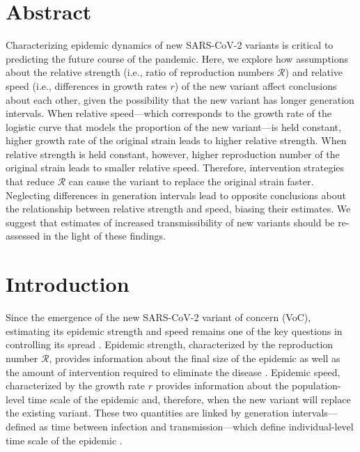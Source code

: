 \documentclass[12pt]{article}
\date{\today}
\newcommand{\RR}{\ensuremath{{\mathcal R}}\xspace}
\begin{document}
\begin{flushleft}{
	\Large
	\textbf{}
}
\end{flushleft}

\section*{Abstract}

Characterizing epidemic dynamics of new SARS-CoV-2 variants is critical to predicting the future course of the pandemic.
Here, we explore how assumptions about the relative strength (i.e., ratio of reproduction numbers $\RR$) and relative speed (i.e., differences in growth rates $r$) of the new variant affect conclusions about each other, given the possibility that the new variant has longer generation intervals.
When relative speed---which corresponds to the growth rate of the logistic curve that models the proportion of the new variant---is held constant, higher growth rate of the original strain leads to higher relative strength.
When relative strength is held constant, however, higher reproduction number of the original strain leads to smaller relative speed.
Therefore, intervention strategies that reduce $\RR$ can cause the variant to replace the original strain faster.
Neglecting differences in generation intervals lead to opposite conclusions about the relationship between relative strength and speed, biasing their estimates.
We suggest that estimates of increased transmissibility of new variants should be re-assessed in the light of these findings.

\section{Introduction}

Since the emergence of the new SARS-CoV-2 variant of concern (VoC), estimating its epidemic strength and speed remains one of the key questions in controlling its spread \citep{switzerland2021variant, davies2021estimated, di2021impact, leung2021early, volz2021transmission,zhao2021}.
Epidemic strength, characterized by the reproduction number $\RR$, provides information about the final size of the epidemic as well as the amount of intervention required to eliminate the disease \citep{anderson1991infectious}.
Epidemic speed, characterized by the growth rate $r$ provides information about the population-level time scale of the epidemic and, therefore, when the new variant will replace the existing variant.
These two quantities are linked by generation intervals---defined as time between infection and transmission---which define individual-level time scale of the epidemic \citep{roberts2007model,svensson2007note,wallinga2007generation}.
\end{document}
